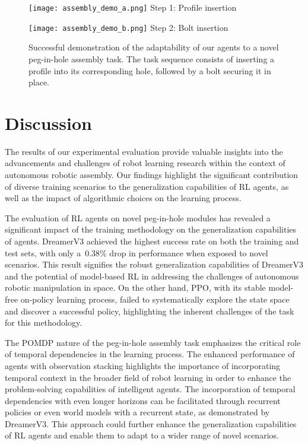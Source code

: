 \begin{figure}[ht]
    \centering
    \begin{minipage}[b]{0.45\linewidth}
        \centering
        \texttt{[image: assembly\_demo\_a.png]}
        {\footnotesize Step 1: Profile insertion}
    \end{minipage}
    \hspace{0.5em}
    \begin{minipage}[b]{0.45\linewidth}
        \centering
        \texttt{[image: assembly\_demo\_b.png]}
        {\footnotesize Step 2: Bolt insertion}
    \end{minipage}
    \caption{Successful demonstration of the adaptability of our agents to a novel peg-in-hole assembly task. The task sequence consists of inserting a profile into its corresponding hole, followed by a bolt securing it in place.}
    \label{fig:assembly-task-sequence}
\end{figure}


\section{Discussion}\label{sec:discussion}

The results of our experimental evaluation provide valuable insights into the advancements and challenges of robot learning research within the context of autonomous robotic assembly. Our findings highlight the significant contribution of diverse training scenarios to the generalization capabilities of RL agents, as well as the impact of algorithmic choices on the learning process.

The evaluation of RL agents on novel peg-in-hole modules has revealed a significant impact of the training methodology on the generalization capabilities of agents. DreamerV3 achieved the highest success rate on both the training and test sets, with only a~0.38\% drop in performance when exposed to novel scenarios. This result signifies the robust generalization capabilities of DreamerV3 and the potential of model-based RL in addressing the challenges of autonomous robotic manipulation in space. On the other hand, PPO, with its stable model-free on-policy learning process, failed to systematically explore the state space and discover a successful policy, highlighting the inherent challenges of the task for this methodology.

The POMDP nature of the peg-in-hole assembly task emphasizes the critical role of temporal dependencies in the learning process. The enhanced performance of agents with observation stacking highlights the importance of incorporating temporal context in the broader field of robot learning in order to enhance the problem-solving capabilities of intelligent agents. The incorporation of temporal dependencies with even longer horizons can be facilitated through recurrent policies or even world models with a recurrent state, as demonstrated by DreamerV3. This approach could further enhance the generalization capabilities of RL agents and enable them to adapt to a wider range of novel scenarios.

